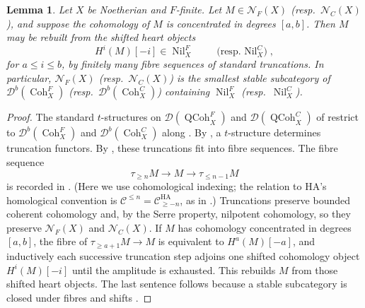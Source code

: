 \documentclass[11pt]{amsart}
\newcommand{\cC}{\mathcal{C}}
\newcommand{\cN}{\mathcal{N}}
\newcommand{\QCoh}{\operatorname{{QCoh}}}
\newcommand{\Coh}{\operatorname{{Coh}}}
\newcommand{\Nil}{\operatorname{Nil}}
\newcommand{\Db}{\mathcal D^b}
\theoremstyle{plain}
\newtheorem{lemma}[lemma]{Lemma}
\theoremstyle{definition}
\numberwithin{equation}{section}
\begin{document}
\begin{lemma}\label{lem:nil-heart-generation}
Let $X$ be Noetherian and $F$-finite.
Let $M\in\cN_F(X)$ (resp.\ $\cN_C(X)$), and suppose the cohomology of $M$ is concentrated in degrees $[a,b]$.
Then $M$ may be rebuilt from the shifted heart objects
\[
 H^i(M)[-i]\in\Nil^F_X
 \qquad\text{(resp.\ $\Nil^C_X$)},
\]
for $a\le i\le b$, by finitely many fibre sequences of standard truncations.
In particular, $\cN_F(X)$ (resp.\ $\cN_C(X)$) is the smallest stable subcategory of $\Db(\Coh^F_X)$ (resp.\ $\Db(\Coh^C_X)$) containing $\Nil^F_X$ (resp.\ $\Nil^C_X$).
\end{lemma}
\begin{proof}
The standard $t$-structures on $\mathcal D(\QCoh^F_X)$ and $\mathcal D(\QCoh^C_X)$ of  restrict to $\Db(\Coh^F_X)$ and $\Db(\Coh^C_X)$ along .
By \cite[Definition 1.2.1.1]{HA}, a $t$-structure determines truncation functors.
By \cite[Proposition 1.2.1.5]{HA}, these truncations fit into fibre sequences.
The fibre sequence
\[
 \tau_{\geq n}M\longrightarrow M\longrightarrow\tau_{\leq n-1}M
\]
is recorded in \cite[Remark 1.2.1.8]{HA}.
(Here we use cohomological indexing; the relation to HA's homological convention is $\cC^{\leq n}=\cC^{\mathrm{HA}}_{\geq -n}$, as in .)
Truncations preserve bounded coherent cohomology and, by the Serre property, nilpotent cohomology, so they preserve $\cN_F(X)$ and $\cN_C(X)$.
If $M$ has cohomology concentrated in degrees $[a,b]$, the fibre of $\tau_{\geq a+1}M\to M$ is equivalent to $H^a(M)[-a]$, and inductively each successive truncation step adjoins one shifted cohomology object $H^i(M)[-i]$ until the amplitude is exhausted.
This rebuilds $M$ from those shifted heart objects.
The last sentence follows because a stable subcategory is closed under fibres and shifts \cite[Lemma 1.1.3.3]{HA}.
\end{proof}
\end{document}
